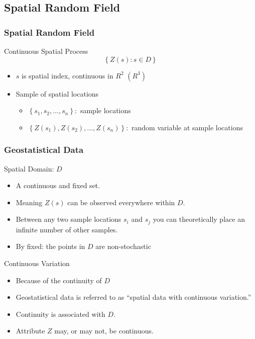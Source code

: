 \documentclass[nototal,handout]{beamer}
\begin{document}
\subsection{Spatial Random Field}
\begin{frame}[<+->]
  \frametitle{Spatial Random Field}
  \begin{block}{Continuous Spatial Process}
    \begin{equation}
    \left \{ Z(s): s \in D \right \}
    \end{equation}
    \begin{itemize}
      \item $s$ is spatial index, continuous in $R^2$ $(R^3)$
      \item Sample of spatial locations
	\begin{itemize}
	  \item $\left \{ s_1,s_2,\ldots,s_n \right\}:$ sample locations
	  \item $\left \{ Z(s_1),Z(s_2),\ldots,Z(s_n) \right\}:$ random
	    variable at sample locations
	\end{itemize}
    \end{itemize}
   \end{block}
 \end{frame}
\begin{frame}[<+->]
  \frametitle{Geostatistical Data}
  \begin{block}{Spatial Domain: $D$ }
    \begin{itemize}
      \item A continuous and fixed set.
      \item Meaning $Z(s)$ can be observed everywhere within $D$.
      \item Between any two sample locations $s_i$ and $s_j$ you can
	theoretically place an infinite number of other samples.
      \item By fixed: the points in $D$ are non-stochastic
    \end{itemize}
   \end{block}
\begin{block}{Continuous Variation}
    \begin{itemize}
      \item Because of the continuity of $D$
      \item Geostatistical data is referred to as ``spatial data with
	continuous variation.''
      \item Continuity is associated with $D$.
      \item Attribute $Z$ may, or may not, be continuous.
    \end{itemize}
   \end{block}
 \end{frame}
\end{document}
